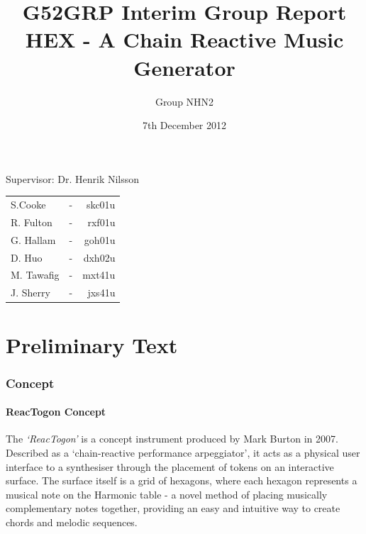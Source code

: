 \documentclass[10pt,a4paper]{article}
\begin{document}
\begin{titlepage}
\title{G52GRP Interim Group Report\\HEX - A Chain Reactive Music Generator }
\author{Group NHN2}
\date{7th December 2012}
\maketitle
\thispagestyle{empty}
\begin{center}
Supervisor: Dr. Henrik Nilsson\\
\bigskip
\begin{tabular}{ l c r }
  S.Cooke & - & skc01u \\
  R. Fulton & - & rxf01u \\
  G. Hallam & - & goh01u \\
  D. Huo & - & dxh02u \\
  M. Tawafig & - & mxt41u \\
  J. Sherry & - & jxs41u \\  
\end{tabular}
\end{center}
\end{titlepage}

\tableofcontents
\pagebreak

\part{Preliminary Text}
\section{Concept}
\subsection{ReacTogon Concept}
The \textit{`ReacTogon’}\cite{modin} is a concept instrument produced by Mark Burton in 2007. Described as a `chain-reactive performance arpeggiator’, it acts as a physical user interface to a synthesiser through the placement of tokens on an interactive surface. The surface itself is a grid of hexagons, where each hexagon represents a musical note on the Harmonic table\cite{wikipediaHarmTab} - a novel method of placing musically complementary notes together, providing an easy and intuitive way to create chords and melodic sequences.\\
\end{document}
